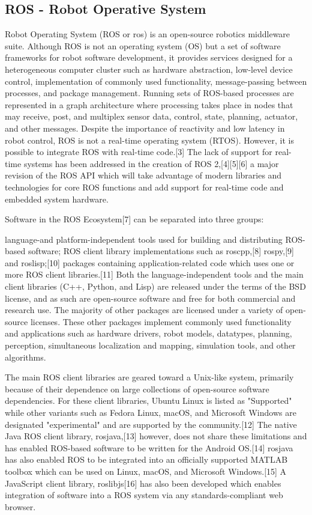 \documentclass[12pt,a4paper,oneside]{book}
\begin{document}
\subsection{ROS - Robot Operative System}



Robot Operating System (ROS or ros) is an open-source robotics middleware suite. Although ROS is not an operating system (OS) but a set of software frameworks for robot software development, it provides services designed for a heterogeneous computer cluster such as hardware abstraction, low-level device control, implementation of commonly used functionality, message-passing between processes, and package management. Running sets of ROS-based processes are represented in a graph architecture where processing takes place in nodes that may receive, post, and multiplex sensor data, control, state, planning, actuator, and other messages. Despite the importance of reactivity and low latency in robot control, ROS is not a real-time operating system (RTOS). However, it is possible to integrate ROS with real-time code.[3] The lack of support for real-time systems has been addressed in the creation of ROS 2,[4][5][6] a major revision of the ROS API which will take advantage of modern libraries and technologies for core ROS functions and add support for real-time code and embedded system hardware.

Software in the ROS Ecosystem[7] can be separated into three groups:

language-and platform-independent tools used for building and distributing ROS-based software;
ROS client library implementations such as roscpp,[8] rospy,[9] and roslisp;[10]
packages containing application-related code which uses one or more ROS client libraries.[11]
Both the language-independent tools and the main client libraries (C++, Python, and Lisp) are released under the terms of the BSD license, and as such are open-source software and free for both commercial and research use. The majority of other packages are licensed under a variety of open-source licenses. These other packages implement commonly used functionality and applications such as hardware drivers, robot models, datatypes, planning, perception, simultaneous localization and mapping, simulation tools, and other algorithms.

The main ROS client libraries are geared toward a Unix-like system, primarily because of their dependence on large collections of open-source software dependencies. For these client libraries, Ubuntu Linux is listed as "Supported" while other variants such as Fedora Linux, macOS, and Microsoft Windows are designated "experimental" and are supported by the community.[12] The native Java ROS client library, rosjava,[13] however, does not share these limitations and has enabled ROS-based software to be written for the Android OS.[14] rosjava has also enabled ROS to be integrated into an officially supported MATLAB toolbox which can be used on Linux, macOS, and Microsoft Windows.[15] A JavaScript client library, roslibjs[16] has also been developed which enables integration of software into a ROS system via any standards-compliant web browser.
\end{document}

